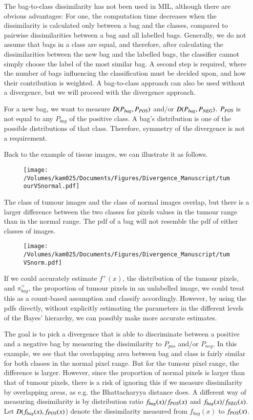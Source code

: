 The bag-to-class dissimilarity has not been used in MIL, although there are obvious advantages:
For one, the computation time decreases when the dissimilarity is calculated only between a bag and the classes, compared to pairwise dissimilarities between a bag and all labelled bags.
Generally, we do not assume that bags in a class are equal, and therefore, after calculating the dissimilarities between the new bag and the labelled bags, the classifier cannot simply choose the label of the most similar bag. A second step is required, where the number of bags influencing the classification must be decided upon, and how their contribution is weighted. 
A bag-to-class approach can also be used without a divergence, but we will proceed with the divergence approach. 

For a new bag, we want to measure $D(P_{bag},P_{\text{\scriptsize{{\it POS}}}})$ and/or $D(P_{bag},P_{\text{\scriptsize{{\it NEG}}}})$.
$P_{\text{\scriptsize{{\it POS}}}}$ is not equal to any $P_{bag}$ of the positive class.
A bag's distribution is one of the possible distributions of that class. 
Therefore, symmetry of the divergence is not a requirement.

Back to the example of tissue images, we can illustrate it as follows. 
\begin{figure}[!h]
  \centering
    \texttt{[image: /Volumes/kam025/Documents/Figures/Divergence\_Manuscript/tumourVSnormal.pdf]}
\end{figure}
The class of tumour images and the class of normal images overlap, but there is a larger difference between the two classes for pixels values in the tumour range than in the normal range. 
The pdf of a bag will not resemble the pdf of either classes of images. 
\begin{figure}[!h]
  \centering
    \texttt{[image: /Volumes/kam025/Documents/Figures/Divergence\_Manuscript/tumVSnorm.pdf]}
\end{figure}

If we could accurately estimate $f^+(x)$, the distribution of the tumour pixels, and $\pi_{bag}^+$, the proportion of tumour pixels in an unlabelled image, we could treat this as a count-based assumption and classify accordingly. 
However, by using the pdfs directly, without explicitly estimating the parameters in the different levels of the Bayes' hierarchy, we can possibly make more accurate estimates. 

The goal is to pick a divergence that is able to discriminate between a positive and a negative bag by measuring the dissimilarity to $P_{pos}$ and/or $P_{neg}$.
In this example, we see that the overlapping area between bag and class is fairly similar for both classes in the normal pixel range. 
But for the tumour pixel range, the difference is larger. 
However, since the proportion of normal pixels is larger than that of tumour pixels, there is a risk of ignoring this if we measure dissimilarity by overlapping areas, as e.g. the Bhattacharyya distance does.
A different way of measuring dissimilarity is by distribution ratio $f_{bag}(x) /f_{\text{\scriptsize{{\it POS}}}}(x)$ and $f_{bag}(x) /f_{\text{\scriptsize{{\it NEG}}}}(x)$.
Let $D(f_{bag}(x), f_{\text{\scriptsize{{\it POS}}}}(x)$) denote the dissimilarity measured from $f_{bag}(x)$ to $f_{\text{\scriptsize{{\it POS}}}}(x)$.

